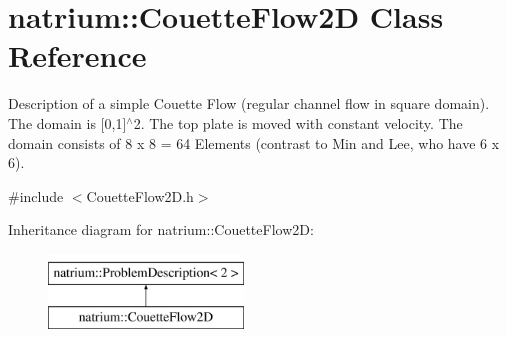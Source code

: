 \hypertarget{classnatrium_1_1CouetteFlow2D}{\section{natrium\-:\-:Couette\-Flow2\-D Class Reference}
\label{classnatrium_1_1CouetteFlow2D}
}


Description of a simple Couette Flow (regular channel flow in square domain). The domain is \mbox{[}0,1\mbox{]}$^\wedge$2. The top plate is moved with constant velocity. The domain consists of 8 x 8 = 64 Elements (contrast to Min and Lee, who have 6 x 6).  




{\ttfamily \#include $<$Couette\-Flow2\-D.\-h$>$}

Inheritance diagram for natrium\-:\-:Couette\-Flow2\-D\-:\begin{figure}[H]
\begin{center}
\leavevmode
\includegraphics[height=2.000000cm]{classnatrium_1_1CouetteFlow2D}
\end{center}
\end{figure}
